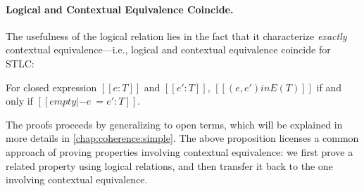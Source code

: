 \paragraph{Logical and Contextual Equivalence Coincide.}

The usefulness of the logical relation lies in the fact that it characterize
\textit{exactly} contextual equivalence---i.e., logical and contextual equivalence
coincide for STLC:

\begin{proposition}
  For closed expression $[[e : T]]$ and $[[e' : T]]$, $[[ (e, e') in E(T)  ]]$ if and only if $[[  empty |- e ~= e' : T  ]]$.
\end{proposition}

The proofs proceeds by generalizing to open terms, which will be explained in
more details in \cref{chap:coherence:simple}. The above proposition licenses a
common approach of proving properties involving contextual equivalence: we first
prove a related property using logical relations, and then transfer it back to
the one involving contextual equivalence.




